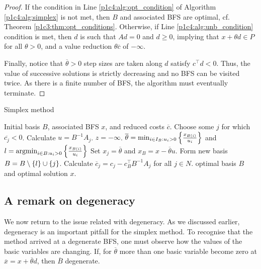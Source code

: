 \begin{proof}
	If the condition in Line \ref{p1c4:alg:opt_condition} of Algorithm \ref{p1c4:alg:simplex} is not met, then $B$ and associated BFS are optimal, cf. Theorem \ref{p1c3:thm:opt_conditions}. Otherwise, if Line \ref{p1c4:alg:unb_condition} condition is met, then $d$ is such that $Ad = 0$ and $d \geq 0$, implying that $x + \theta d \in P$ for all $\theta > 0$, and a value reduction $\theta\overline{c}$ of $-\infty$.
	
	Finally, notice that $\overline{\theta}>0$ step sizes are taken along $d$ satisfy $c^\top d < 0$. Thus, the value of successive solutions is strictly decreasing and no BFS can be visited twice. As there is a finite number of BFS, the algorithm must eventually terminate.
\end{proof}

\begin{algorithm}[h]
	\caption{Simplex method} \label{p1c4:alg:simplex}
	\begin{algorithmic}[1] %
		 Initial basis $B$, associated BFS $x$, and reduced costs $\overline{c}$.
		 \label{p1c4:alg:opt_condition} 
		    \State Choose some $j$ for which $\overline{c_j} < 0$. Calculate $u = B^{-1}A_j$. 
		     \label{p1c4:alg:unb_condition}
				 $z = -\infty$.		
			\Else
				\State $\overline{\theta} = \min_{i \in I_B : u_i > 0} \left\{ \frac{x_{B(i)}}{u_i} \right \}$ and $l = \mathop{\rm argmin}_{i \in B : u_i > 0} \left\{ \frac{x_{B(i)}}{u_i} \right \}$ 
				\State Set $x_j = \overline{\theta}$ and $x_B = x - \overline{\theta}u$. Form new basis $B = B \setminus \left\{ l \right \} \cup \left\{ j \right \}$.  
				\State Calculate $\overline{c}_j = c_j - c_B^\top B^{-1}A_j$ for all $j \in N$.
			\EndIf
		\EndWhile
		 optimal basis $B$ and optimal solution $x$.
	\end{algorithmic}
\end{algorithm}


\subsection{A remark on degeneracy}

We now return to the issue related with degeneracy. As we discussed earlier, degeneracy is an important pitfall for the simplex method. To recognise that the method arrived at a degenerate BFS, one must observe how the values of the basic variables are changing. If, for $\overline{\theta}$ more than one basic variable become zero at $\overline{x} = x +\overline{\theta}d$, then $\overline{B}$ degenerate.

